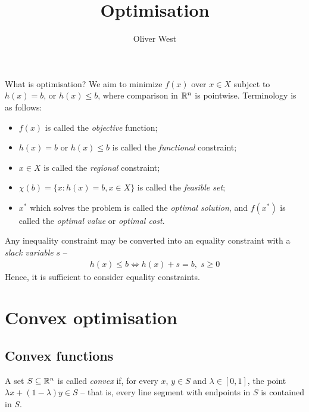 \documentclass{../../template/note}
\author{Oliver West}
\title{Optimisation}
\date{}
\begin{document}
    \maketitle

    \tableofcontents


    What is optimisation? We aim to minimize $f(x)$ over $x \in X$ subject to $h(x) = b$, or $h(x) \leq b$, where comparison in $\mathbb R^n$ is pointwise. Terminology is as follows:

    \begin{itemize}
        \item $f(x)$ is called the \emph{objective} function;
        \item $h(x) = b$ or $h(x) \leq b$ is called the \emph{functional} constraint;
        \item $x \in X$ is called the \emph{regional} constraint;
        \item $\chi(b) = \{x: h(x) = b, x \in X\}$ is called the \emph{feasible set};
        \item $x^*$ which solves the problem is called the \emph{optimal solution}, and $f(x^*)$ is called the \emph{optimal value} or \emph{optimal cost}.
    \end{itemize}
    
    \begin{proposition}
        Any inequality constraint may be converted into an equality constraint with a \emph{slack variable} $s$ --
        \begin{align*}
            h(x) \leq b \iff h(x) + s = b,\; s \geq 0
        \end{align*}
        Hence, it is sufficient to consider equality constraints.
    \end{proposition}

    \section{Convex optimisation}

    \subsection{Convex functions}

    \begin{definition}
        A set $S \subseteq \mathbb R^n$ is called \emph{convex} if, for every $x$, $y \in S$ and $\lambda \in [0, 1]$, the point $\lambda x + (1-\lambda)y \in S$ -- that is, every line segment with endpoints in $S$ is contained in $S$.
    \end{definition}
    
\end{document}
